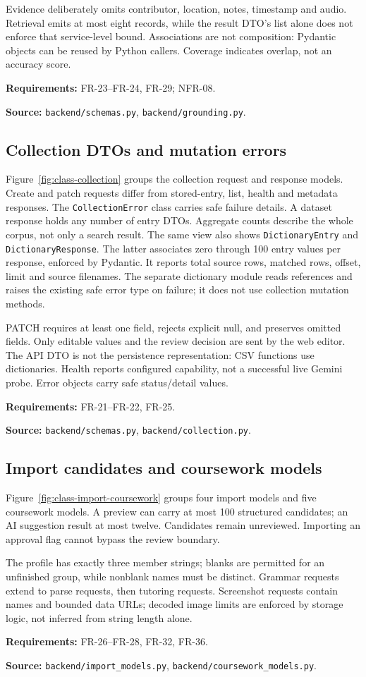\documentclass[11pt,a4paper]{article}
\newcommand{\viewtrace}[2]{\par\smallskip\noindent\textbf{Requirements:} #1.\par
  \noindent\textbf{Source:} #2.\par\medskip}
\begin{document}
Evidence deliberately omits contributor, location, notes, timestamp and audio.
Retrieval emits at most eight records, while the result DTO's list alone does
not enforce that service-level bound. Associations are not composition:
Pydantic objects can be reused by Python callers. Coverage indicates overlap,
not an accuracy score.
\viewtrace{FR-23--FR-24, FR-29; NFR-08}{\nolinkurl{backend/schemas.py}, \nolinkurl{backend/grounding.py}}

\subsection{Collection DTOs and mutation errors}
Figure~\ref{fig:class-collection} groups the collection request and response
models. Create and patch requests differ from stored-entry, list, health and
metadata responses. The \nolinkurl{CollectionError} class carries safe failure
details. A dataset response holds any number of entry DTOs.
Aggregate counts describe the whole corpus, not only a search result.
The same view also shows \nolinkurl{DictionaryEntry} and
\nolinkurl{DictionaryResponse}. The latter associates zero through 100 entry
values per response, enforced by Pydantic. It reports total source rows,
matched rows, offset, limit and source filenames. The separate dictionary
module reads references and raises the existing safe error type on failure;
it does not use collection mutation methods.

PATCH requires at least one field, rejects explicit null, and preserves
omitted fields. Only editable values and the review decision are sent by the
web editor. The API DTO is not the persistence representation: CSV functions
use dictionaries. Health reports configured capability, not a successful live
Gemini probe. Error objects carry safe status/detail values.
\viewtrace{FR-21--FR-22, FR-25}{\nolinkurl{backend/schemas.py}, \nolinkurl{backend/collection.py}}

\subsection{Import candidates and coursework models}
Figure~\ref{fig:class-import-coursework} groups four import models and five
coursework models. A preview can carry at most 100 structured candidates;
an AI suggestion result at most twelve. Candidates remain unreviewed.
Importing an approval flag cannot bypass the review boundary.

The profile has exactly three member strings; blanks are permitted for an
unfinished group, while nonblank names must be distinct. Grammar requests
extend to parse requests, then tutoring requests. Screenshot requests contain
names and bounded data URLs; decoded image limits are enforced by storage
logic, not inferred from string length alone.
\viewtrace{FR-26--FR-28, FR-32, FR-36}
{\nolinkurl{backend/import_models.py}, \nolinkurl{backend/coursework_models.py}}
\end{document}
